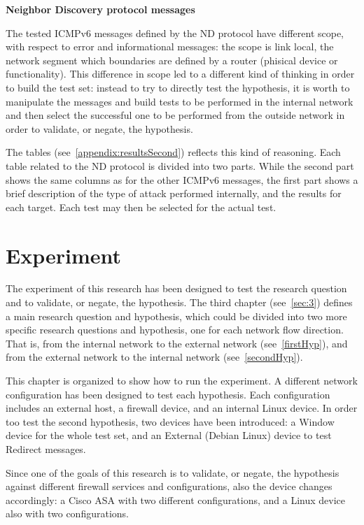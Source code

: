 \documentclass[12pt]{article}
\begin{document}
\textbf{Neighbor Discovery protocol messages}

The tested ICMPv6 messages defined by the ND protocol have different scope, with respect to error and informational messages: the scope is link local, the network segment which boundaries are defined by a router (phisical device or functionality). This difference in scope led to a different kind of thinking in order to build the test set: instead to try to directly test the hypothesis, it is worth to manipulate the messages and build tests to be performed in the internal network and then select the successful one to be performed from the outside network in order to validate, or negate, the hypothesis.

The tables (see~\ref{appendix:resultsSecond}) reflects this kind of reasoning. Each table related to the ND protocol is divided into two parts. While the second part shows the same columns as for the other ICMPv6 messages, the first part shows a brief description of the type of attack performed internally, and the results for each target. Each test may then be selected for the actual test.


\pagebreak

\section{Experiment}
\label{sec:5}

The experiment of this research has been designed to test the research question and to validate, or negate, the hypothesis. The third chapter (see~\ref{sec:3}) defines a main research question and hypothesis, which could be divided into two more specific research questions and hypothesis, one for each network flow direction. That is, from the internal network to the external network (see~\ref{firstHyp}), and from the external network to the internal network (see~\ref{secondHyp}).

This chapter is organized to show how to run the experiment. A different network configuration has been designed to test each hypothesis. Each configuration includes an external host, a firewall device, and an internal Linux device. In order too test the second hypothesis, two devices have been introduced: a Window device for the whole test set, and an External (Debian Linux) device to test Redirect messages.

Since one of the goals of this research is to validate, or negate, the hypothesis against different firewall services and configurations, also the device changes accordingly: a Cisco ASA with two different configurations, and a Linux device also with two configurations.
\end{document}

